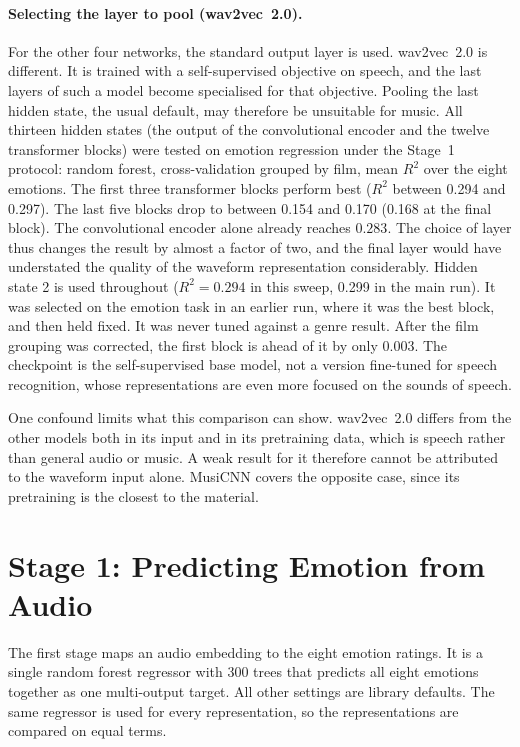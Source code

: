 \paragraph{Selecting the layer to pool (wav2vec~2.0).} For the other four networks, the standard output layer is used. wav2vec~2.0 is different. It is trained with a self-supervised objective on speech, and the last layers of such a model become specialised for that objective. Pooling the last hidden state, the usual default, may therefore be unsuitable for music. All thirteen hidden states (the output of the convolutional encoder and the twelve transformer blocks) were tested on emotion regression under the Stage~1 protocol: random forest, cross-validation grouped by film, mean $R^2$ over the eight emotions. The first three transformer blocks perform best ($R^2$ between 0.294 and 0.297). The last five blocks drop to between 0.154 and 0.170 (0.168 at the final block). The convolutional encoder alone already reaches $0.283$. The choice of layer thus changes the result by almost a factor of two, and the final layer would have understated the quality of the waveform representation considerably. Hidden state 2 is used throughout ($R^2=0.294$ in this sweep, 0.299 in the main run). It was selected on the emotion task in an earlier run, where it was the best block, and then held fixed. It was never tuned against a genre result. After the film grouping was corrected, the first block is ahead of it by only 0.003. The checkpoint is the self-supervised base model, not a version fine-tuned for speech recognition, whose representations are even more focused on the sounds of speech.

One confound limits what this comparison can show. wav2vec~2.0 differs from the other models both in its input and in its pretraining data, which is speech rather than general audio or music. A weak result for it therefore cannot be attributed to the waveform input alone. MusiCNN covers the opposite case, since its pretraining is the closest to the material.

\section{Stage 1: Predicting Emotion from Audio}
\label{sec:methods_stage1}

The first stage maps an audio embedding to the eight emotion ratings. It is a single random forest regressor with 300 trees that predicts all eight emotions together as one multi-output target. All other settings are library defaults. The same regressor is used for every representation, so the representations are compared on equal terms.

